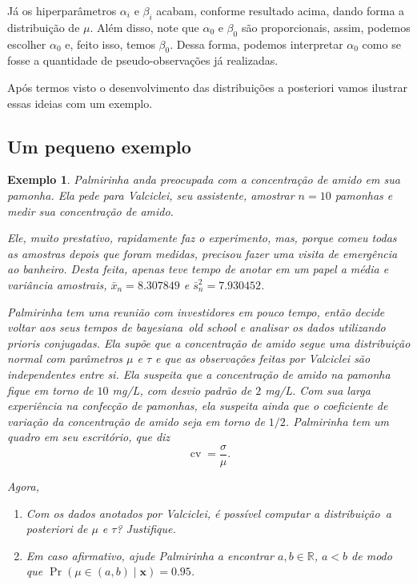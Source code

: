 \documentclass{article}
\newtheorem{example}{Exemplo}
\begin{document}
Já os hiperparâmetros $\alpha_i$ e $\beta_i$ acabam, conforme resultado acima, dando forma a distribuição de $\mu$. Além disso, note que $\alpha_0$ e $\beta_0$ são proporcionais, assim, podemos escolher $\alpha_0$ e, feito isso, temos $\beta_0$. Dessa forma, podemos interpretar $\alpha_0$ como se fosse a quantidade de pseudo-observações já realizadas.

Após termos visto o desenvolvimento das distribuições a posteriori vamos ilustrar essas ideias com um exemplo.

\subsection*{Um pequeno exemplo}

\begin{example}
    Palmirinha anda preocupada com a concentração de amido em sua pamonha. Ela pede para Valciclei, seu assistente, amostrar $n=10$ pamonhas e medir sua concentração de amido.
    
    Ele, muito prestativo, rapidamente faz o experimento, mas, porque comeu todas as amostras depois que foram medidas, precisou fazer uma visita de emergência ao banheiro. Desta feita, apenas teve tempo de anotar em um papel a média e variância amostrais, $\bar{x}_n =  8.307849$ e $\bar{s}^2_n = 7.930452$.
    
    Palmirinha tem uma reunião com investidores em pouco tempo, então decide voltar aos seus tempos de bayesiana~\textit{old school} e analisar os dados utilizando prioris conjugadas. Ela supõe que a concentração de amido segue uma distribuição normal com parâmetros $\mu$ e $\tau$ e que as observações feitas por Valciclei são independentes entre si. Ela suspeita que a concentração de amido na pamonha fique em torno de $10$ mg/L, com desvio padrão de $2$ mg/L. Com sua larga experiência na confecção de pamonhas, ela suspeita ainda que o coeficiente de variação da concentração de amido seja em torno de $1/2$. Palmirinha tem um quadro em seu escritório, que diz
    \[\operatorname{cv} = \frac{\sigma}{\mu}.\]
    
    Agora, 
    \begin{enumerate}
        \item
            Com os dados anotados por Valciclei, é possível computar a distribuição~\textit{a posteriori} de $\mu$ e $\tau$? Justifique.
            
        \item
            Em caso afirmativo, ajude Palmirinha a encontrar $a, b \in \mathbb{R}$, $a < b$ de modo que $\operatorname{Pr}(\mu \in (a, b) \mid \boldsymbol{x}) = 0.95$.
    \end{enumerate}
\end{example}
\end{document}
